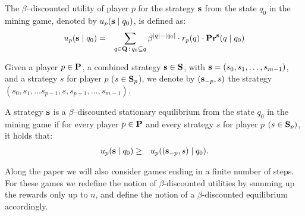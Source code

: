 \begin{mydef}
The $\beta$--discounted utility of player $p$ for the strategy $\mathbf{s}$ from the state $q_0$ in 
the mining game, denoted by $u_p(\mathbf{s} \mid q_0)$, is defined as:
\begin{eqnarray*}
u_p(\mathbf{s} \mid q_0) & = & \sum_{q \in \mathbf{Q} \,:\, q_0 \subseteq q} \beta^{|q|-|q_0|} \cdot  r_p(q) \cdot \mathbf{Pr}^{\mathbf{s}}(q \mid q_0)
\end{eqnarray*}
\end{mydef}
Given a player $p \in \mathbf{P}$, a combined strategy $\mathbf{s} \in \mathbf{S}$, with $\mathbf{s} = (s_0,s_1, \ldots, s_{m-1})$, and a strategy $s$ for player $p$ ($s \in \mathbf{S}_p$), we denote by $(\mathbf{s}_{-p}, s)$ the strategy $(s_0, s_1, \ldots s_{p-1},s,s_{p+1}, \ldots, s_{m-1})$.
\begin{mydef}
A strategy $\mathbf{s}$ is a $\beta$--discounted stationary equilibrium from the state $q_0$ in  the %
mining game if for every player $p \in \mathbf{P}$ and every strategy $s$ for player $p$ $(s \in\mathbf{S}_p)$, it holds that:
\begin{eqnarray*}u_p(\mathbf{s} \mid q_0)  & \geq  & u_p ((\mathbf{s}_{-p},s) \mid q_0).
\end{eqnarray*}
\end{mydef}
Along the paper we will also consider games ending in a finite number of steps. For these games we redefine the notion of $\beta$-discounted utilities by summing up the rewards only up to $n$, and define the notion of a $\beta$-discounted equilibrium accordingly. 

